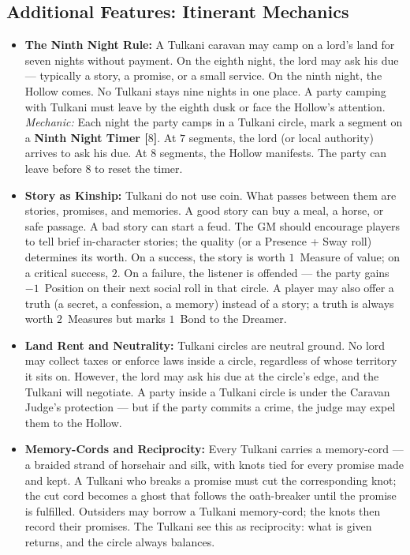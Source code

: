 \subsection*{Additional Features: Itinerant Mechanics}
\label{sec:tulkani-mechanics}

\begin{itemize}
\item \textbf{The Ninth Night Rule:} A Tulkani caravan may camp on a lord's land for seven nights without payment. On the eighth night, the lord may ask his due --- typically a story, a promise, or a small service. On the ninth night, the Hollow comes. No Tulkani stays nine nights in one place. A party camping with Tulkani must leave by the eighth dusk or face the Hollow's attention.
  \hfill \textit{Mechanic:} Each night the party camps in a Tulkani circle, mark a segment on a \textbf{Ninth Night Timer [$8$]}. At $7$ segments, the lord (or local authority) arrives to ask his due. At $8$ segments, the Hollow manifests. The party can leave before $8$ to reset the timer.
\item \textbf{Story as Kinship:} Tulkani do not use coin. What passes between them are stories, promises, and memories. A good story can buy a meal, a horse, or safe passage. A bad story can start a feud. The GM should encourage players to tell brief in-character stories; the quality (or a Presence + Sway roll) determines its worth. On a success, the story is worth $1$~Measure of value; on a critical success, $2$. On a failure, the listener is offended --- the party gains $-1$~Position on their next social roll in that circle. A player may also offer a truth (a secret, a confession, a memory) instead of a story; a truth is always worth $2$~Measures but marks $1$~Bond to the Dreamer.
\item \textbf{Land Rent and Neutrality:} Tulkani circles are neutral ground. No lord may collect taxes or enforce laws inside a circle, regardless of whose territory it sits on. However, the lord may ask his due at the circle's edge, and the Tulkani will negotiate. A party inside a Tulkani circle is under the Caravan Judge's protection --- but if the party commits a crime, the judge may expel them to the Hollow.
\item \textbf{Memory-Cords and Reciprocity:} Every Tulkani carries a memory-cord --- a braided strand of horsehair and silk, with knots tied for every promise made and kept. A Tulkani who breaks a promise must cut the corresponding knot; the cut cord becomes a ghost that follows the oath-breaker until the promise is fulfilled. Outsiders may borrow a Tulkani memory-cord; the knots then record their promises. The Tulkani see this as reciprocity: what is given returns, and the circle always balances.

\end{itemize}
